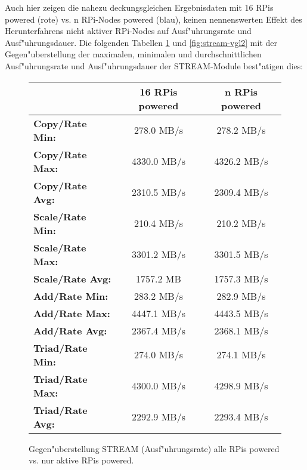 Auch hier zeigen die nahezu deckungsgleichen Ergebnisdaten mit 16 RPis powered (rote) vs. n RPi-Nodes powered (blau), keinen  nennenswerten Effekt des Herunterfahrens nicht aktiver RPi-Nodes auf Ausf"uhrungsrate und Ausf"uhrungsdauer. Die folgenden Tabellen \ref{fig:stream-vgl1} und \ref{fig:stream-vgl2} mit der Gegen"uberstellung der maximalen, minimalen und durchschnittlichen Ausf"uhrungsrate und Ausf"uhrungsdauer der STREAM-Module best"atigen dies: 

\begin{figure}[htb]
  \centering
  \begin{tabular}{|l|c|c|}
    \hline 
    & \textbf{16 RPis powered} & \textbf{n RPis powered}\\ 
    \hline 
    \textbf{Copy/Rate Min:} & 278.0 MB/s & 278.2 MB/s \\
    \hline 
	\textbf{Copy/Rate Max:} & 4330.0 MB/s & 4326.2 MB/s \\
    \hline
    \textbf{Copy/Rate Avg:} & 2310.5 MB/s & 2309.4 MB/s \\
 	\hline 
   	\textbf{Scale/Rate Min:} & 210.4 MB/s & 210.2 MB/s \\
   	\hline
   	\textbf{Scale/Rate Max:} & 3301.2 MB/s & 3301.5 MB/s \\
 	\hline 
   	\textbf{Scale/Rate Avg:} & 1757.2 MB & 1757.3 MB/s \\
 	\hline 
 	\textbf{Add/Rate Min:} & 283.2 MB/s & 282.9 MB/s \\
 	\hline 
   	\textbf{Add/Rate Max:} & 4447.1 MB/s & 4443.5 MB/s \\
  	\hline 
   	\textbf{Add/Rate Avg:} & 2367.4 MB/s & 2368.1 MB/s \\
 	\hline 
   	\textbf{Triad/Rate Min:} & 274.0 MB/s & 274.1 MB/s\\
 	\hline 	
   	\textbf{Triad/Rate Max:} & 4300.0 MB/s & 4298.9 MB/s \\
 	\hline 
   	\textbf{Triad/Rate Avg:} & 2292.9 MB/s & 2293.4 MB/s \\
   	\hline
 	\end{tabular}
  \caption{Gegen"uberstellung STREAM (Ausf"uhrungsrate) alle RPis powered vs. nur aktive RPis powered.}\label{fig:stream-vgl1}
\end{figure}

